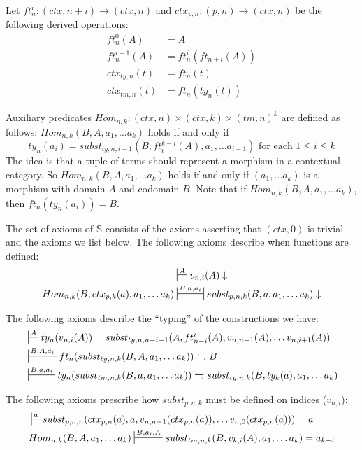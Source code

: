 \documentclass[reqno]{amsart}
\theoremstyle{definition}
\theoremstyle{remark}
\newcommand{\substTh}{\mathbb{S}}
\numberwithin{figure}{section}
\begin{document}
Let $ft^i_n : (ctx,n+i) \to (ctx,n)$ and $ctx_{p,n} : (p,n) \to (ctx,n)$ be the following derived operations:
\begin{align*}
ft^0_n(A) & = A \\
ft^{i+1}_n(A) & = ft^i_n(ft_{n+i}(A)) \\
ctx_{ty,n}(t) & = ft_n(t) \\
ctx_{tm,n}(t) & = ft_n(ty_n(t))
\end{align*}

Auxiliary predicates $Hom_{n,k} : (ctx,n) \times (ctx,k) \times (tm,n)^k$ are defined as follows: $Hom_{n,k}(B, A, a_1, \ldots a_k)$ holds if and only if
\[ ty_n(a_i) = subst_{ty,n,i-1}(B, ft^{k-i}_i(A), a_1, \ldots a_{i-1}) \text{ for each } 1 \leq i \leq k \]
The idea is that a tuple of terms should represent a morphism in a contextual category.
So $Hom_{n,k}(B, A, a_1, \ldots a_k)$ holds if and only if $(a_1, \ldots a_k)$ is a morphism with domain $A$ and codomain $B$.
Note that if $Hom_{n,k}(B, A, a_1, \ldots a_k)$, then $ft_n(ty_n(a_i)) = B$.

The set of axioms of $\substTh$ consists of the axioms asserting that $(ctx,0)$ is trivial and the axioms we list below.
The following axioms describe when functions are defined:
\begin{align}
\label{ax:def-var}
                                             & \sststile{}{A}           v_{n,i}(A) \downarrow \\
\label{ax:def-subst}
Hom_{n,k}(B, ctx_{p,k}(a), a_1, \ldots a_k)  & \ssststile{}{B, a, a_i}  subst_{p,n,k}(B, a, a_1, \ldots a_k) \downarrow
\end{align}

The following axioms describe the ``typing'' of the constructions we have:
\begin{align}
\label{ax:type-var}
& \sststile{}{A}         ty_n(v_{n,i}(A)) = subst_{ty,n,n-i-1}(A, ft^i_{n-i}(A), v_{n,n-1}(A), \ldots v_{n,i+1}(A)) \\
\label{ax:type-subst-ty}
& \sststile{}{B, A, a_i} ft_n(subst_{ty,n,k}(B, A, a_1, \ldots a_k)) \leftrightharpoons B \\
\label{ax:type-subst-tm}
& \sststile{}{B, a, a_i} ty_n(subst_{tm,n,k}(B, a, a_1, \ldots a_k)) \leftrightharpoons subst_{ty,n,k}(B, ty_k(a), a_1, \ldots a_k)
\end{align}

The following axioms prescribe how $subst_{p,n,k}$ must be defined on indices ($v_{n,i}$):
\begin{align}
\label{ax:subst-var}
& \sststile{}{a}         subst_{p,n,n}(ctx_{p,n}(a), a, v_{n,n-1}(ctx_{p,n}(a)), \ldots v_{n,0}(ctx_{p,n}(a))) = a \\
\label{ax:var-subst}
& Hom_{n,k}(B, A, a_1, \ldots a_k) \sststile{}{B, a_i, A} subst_{tm,n,k}(B, v_{k,i}(A), a_1, \ldots a_k) = a_{k-i}
\end{align}
\end{document}
